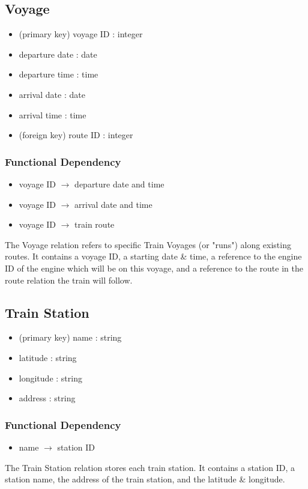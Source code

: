 \documentclass[a4paper]{article}
\begin{document}
\subsection*{Voyage}
\begin{itemize}
\item (primary key) voyage ID : integer
\item departure date : date
\item departure time : time
\item arrival date : date
\item arrival time : time
\item (foreign key) route ID : integer
\end{itemize}
\subsubsection*{Functional Dependency}
\begin{itemize}
\item voyage ID $\rightarrow$ departure date and time 
\item voyage ID $\rightarrow$ arrival date and time 
\item voyage ID $\rightarrow$ train route
\end{itemize}
The Voyage relation refers to specific Train Voyages (or "runs") along existing routes. It contains a voyage ID, a starting date \& time, a reference to the engine ID of the engine which will be on this voyage, and a reference to the route in the route relation the train will follow.

\subsection*{Train Station}
\begin{itemize}
\item (primary key) name : string
\item latitude : string
\item longitude : string
\item address : string
\end{itemize}
\subsubsection*{Functional Dependency}
\begin{itemize}
\item name $\rightarrow$ station ID
\end{itemize}
The Train Station relation stores each train station. It contains a station ID, a station name, the address of the train station, and the latitude \& longitude.
\end{document}
